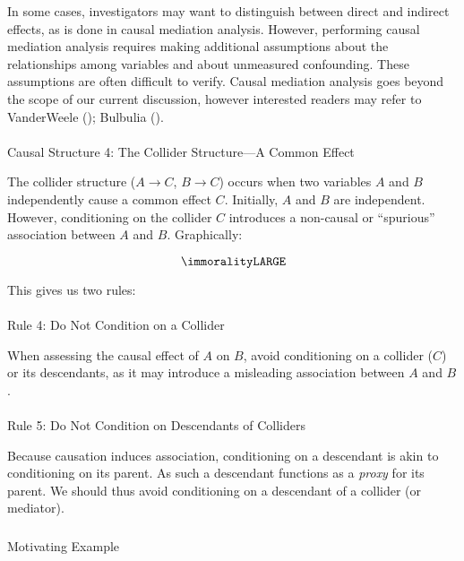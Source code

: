 \documentclass[
  singlecolumn]{article}
\makeatletter
\let\oldparagraph\paragraph
\renewcommand{\paragraph}{
    \@ifstar
      \xxxParagraphStar
      \xxxParagraphNoStar
  }
\newcommand{\xxxParagraphStar}[1]{\oldparagraph*{#1}\mbox{}}
\newcommand{\xxxParagraphNoStar}[1]{\oldparagraph{#1}\mbox{}}
\let\oldsubparagraph\subparagraph
\renewcommand{\subparagraph}{
    \@ifstar
      \xxxSubParagraphStar
      \xxxSubParagraphNoStar
  }
\newcommand{\xxxSubParagraphStar}[1]{\oldsubparagraph*{#1}\mbox{}}
\newcommand{\xxxSubParagraphNoStar}[1]{\oldsubparagraph{#1}\mbox{}}
\makeatother
\begin{document}
In some cases, investigators may want to distinguish between direct and
indirect effects, as is done in causal mediation analysis. However,
performing causal mediation analysis requires making additional
assumptions about the relationships among variables and about unmeasured
confounding. These assumptions are often difficult to verify. Causal
mediation analysis goes beyond the scope of our current discussion,
however interested readers may refer to VanderWeele
(); Bulbulia
().

\paragraph{Causal Structure 4: The Collider Structure---A Common
Effect}\label{causal-structure-4-the-collider-structurea-common-effect}

The collider structure (\(A \to C\), \(B \to C\)) occurs when two
variables \(A\) and \(B\) independently cause a common effect \(C\).
Initially, \(A\) and \(B\) are independent. However, conditioning on the
collider \(C\) introduces a non-causal or ``spurious'' association
between \(A\) and \(B\). Graphically:

\[
\immoralityLARGE
\]

This gives us two rules:

\paragraph{Rule 4: Do Not Condition on a
Collider}\label{rule-4-do-not-condition-on-a-collider}

When assessing the causal effect of \(A\) on \(B\), avoid conditioning
on a collider (\(C\)) or its descendants, as it may introduce a
misleading association between \(A\) and \(B\).

\paragraph{Rule 5: Do Not Condition on Descendants of
Colliders}\label{rule-5-do-not-condition-on-descendants-of-colliders}

Because causation induces association, conditioning on a descendant is
akin to conditioning on its parent. As such a descendant functions as a
\emph{proxy} for its parent. We should thus avoid conditioning on a
descendant of a collider (or mediator).

\subparagraph{Motivating Example}\label{motivating-example-3}
\end{document}
